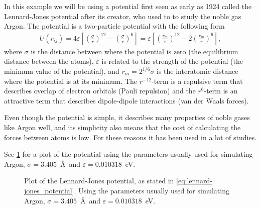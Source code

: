 In this example we will be using a potential first seen as early as 1924\cite{jones1924potential} called the Lennard-Jones potential after its creator, who used to to study the noble gas Argon. The potential is a two-particle potential with the following form
\begin{align}
    U(r_{ij}) = 4\varepsilon\left[ \left(\frac{\sigma}{r}\right)^{12} - \left(\frac{\sigma}{r}\right)^{6} \right]
    = \varepsilon\left[ \left(\frac{r_m}{r}\right)^{12} - 2\left(\frac{r_m}{r}\right)^{6} \right],
    \label{eq:lennard-jones_potential}
\end{align}
where $\sigma$ is the distance between where the potential is zero (the equilibrium distance between the atoms), $\varepsilon$ is related to the strength of the potential (the minimum value of the potential), and $r_m = 2^{1/6} \sigma$ is the interatomic distance where the potential is at its minimum. The $r^{-12}$-term is a repulsive term that describes overlap of electron orbitals (Pauli repulsion) and the $r^{6}$-term is an attractive term that describes dipole-dipole interactions (van der Waals forces). 

Even though the potential is simple, it describes many properties of noble gases like Argon well, and its simplicity also means that the cost of calculating the forces between atoms is low. For these reasons it has been used in a lot of studies. 

See \cref{fig:lennard-jones_potential} for a plot of the potential using the parameters usually used for simulating Argon\cite{frenkel2001understanding}, $\sigma = 3.405$~\AA\ and $\varepsilon = 0.010318$~eV.
%
%
\begin{figure}[htpb]%
    \centering%
    \caption{%
        Plot of the Lennard-Jones potential, as stated in \cref{eq:lennard-jones_potential}. Using the parameters usually used for simulating Argon, $\sigma = 3.405$~\AA\ and $\varepsilon = 0.010318$~eV\cite{frenkel2001understanding}.%
        \label{fig:lennard-jones_potential}%
    }%
\end{figure}%

